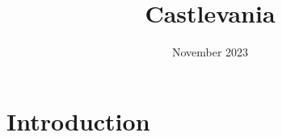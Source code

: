 \documentclass{article}
\title{\textbf{Castlevania}}
\date{November 2023}
\begin{document}
\maketitle

\section{Introduction}
\end{document}
